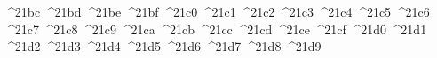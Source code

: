 {  ^^^^21bc%
  ^^^^21bd%
  ^^^^21be%
  ^^^^21bf%
  ^^^^21c0%
  ^^^^21c1%
  ^^^^21c2%
  ^^^^21c3%
  ^^^^21c4%
  ^^^^21c5%
  ^^^^21c6%
  ^^^^21c7%
  ^^^^21c8%
  ^^^^21c9%
  ^^^^21ca%
  ^^^^21cb%
  ^^^^21cc%
  ^^^^21cd%
  ^^^^21ce%
  ^^^^21cf%
  ^^^^21d0%
  ^^^^21d1%
  ^^^^21d2%
  ^^^^21d3%
  ^^^^21d4%
  ^^^^21d5%
  ^^^^21d6%
  ^^^^21d7%
  ^^^^21d8%
  ^^^^21d9%
}
